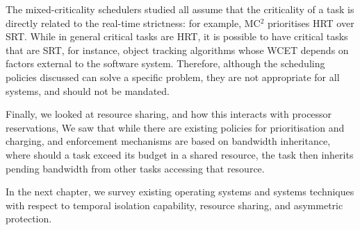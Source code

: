 The mixed-criticality schedulers studied all assume that the criticality of a task is directly
related to the real-time strictness: for example, MC$^2$ prioritises \gls{HRT} over \gls{SRT}. 
While in
general critical tasks are \gls{HRT}, it is possible to have critical tasks that are \gls{SRT}, for
instance, object tracking algorithms whose \gls{WCET} depends on factors external to the software
system. Therefore, although the scheduling policies discussed can solve a specific problem, they are
not appropriate for all systems, and should not be mandated.

Finally, we looked at resource sharing, and how this interacts with processor reservations,
We saw that while there are existing policies for prioritisation and charging, and enforcement
mechanisms are based on bandwidth inheritance, where should a task exceed its budget in a shared
resource, the task then inherits pending bandwidth from other tasks accessing that resource.

In the next chapter, we survey existing operating systems and systems techniques with respect to
temporal isolation capability, resource sharing, and asymmetric protection.
